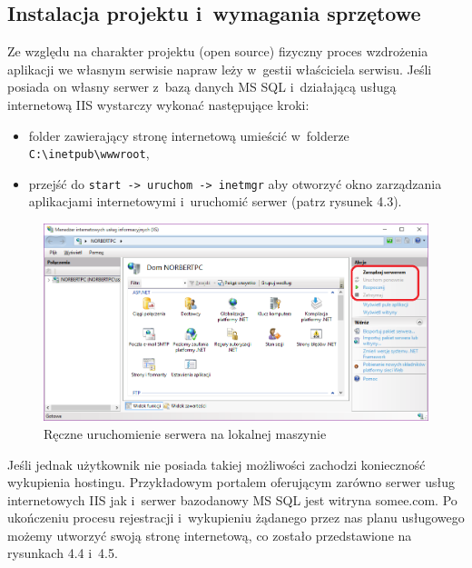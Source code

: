 \documentclass[a4paper,11pt]{article}
\begin{document}
\subsection{Instalacja projektu i~wymagania sprzętowe}
Ze względu na charakter projektu (open source) fizyczny proces wzdrożenia aplikacji we własnym serwisie napraw leży w~gestii właściciela serwisu. Jeśli posiada on własny serwer z~bazą danych MS SQL i~działającą usługą internetową IIS wystarczy wykonać następujące kroki:
\begin{itemize}
	\item folder zawierający stronę internetową umieścić w~folderze \texttt{C:\textbackslash inetpub\textbackslash wwwroot},
	\item przejść do \texttt{start -> uruchom -> inetmgr} aby otworzyć okno zarządzania aplikacjami internetowymi i~uruchomić serwer (patrz rysunek 4.3).
\end{itemize}
\begin{figure}[h!]
	\centering
	\includegraphics[width=\textwidth,height=0.6\textheight]{inetMgr.png}
	\caption{Ręczne uruchomienie serwera na lokalnej maszynie}
\end{figure}
Jeśli jednak użytkownik nie posiada takiej możliwości zachodzi konieczność wykupienia hostingu. Przykładowym portalem oferującym zarówno serwer usług internetowych IIS jak i~serwer bazodanowy MS SQL jest witryna somee.com. Po ukończeniu procesu rejestracji i~wykupieniu żądanego przez nas planu usługowego możemy utworzyć swoją stronę internetową, co zostało przedstawione na rysunkach 4.4 i~4.5.
\end{document}
